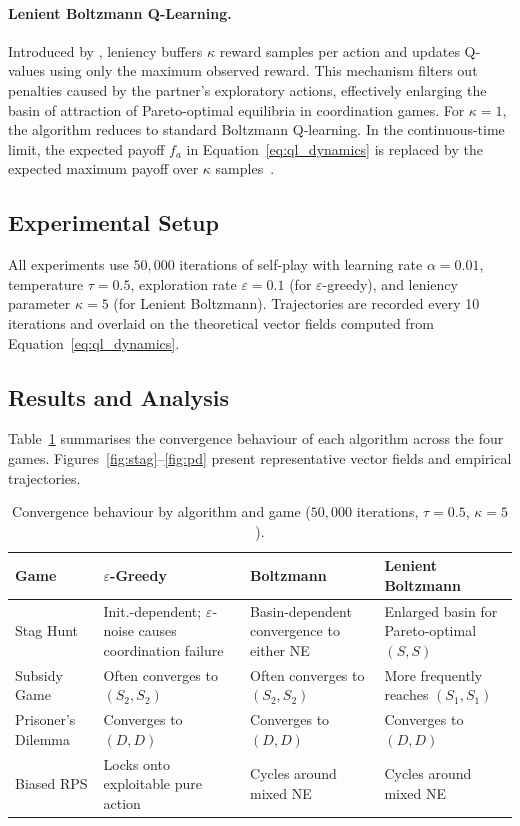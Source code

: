 \documentclass[11pt,a4paper]{article}
\begin{document}
\paragraph{Lenient Boltzmann Q-Learning.}
Introduced by \citet{panait2006}, leniency buffers $\kappa$ reward samples per action and updates Q-values using only the maximum observed reward. This mechanism filters out penalties caused by the partner's exploratory actions, effectively enlarging the basin of attraction of Pareto-optimal equilibria in coordination games. For $\kappa = 1$, the algorithm reduces to standard Boltzmann Q-learning. In the continuous-time limit, the expected payoff $f_a$ in Equation~\eqref{eq:ql_dynamics} is replaced by the expected maximum payoff over $\kappa$ samples~\citep{panait2006,bloembergen2015}.

\subsection{Experimental Setup}
All experiments use $50{,}000$ iterations of self-play with learning rate $\alpha = 0.01$, temperature $\tau = 0.5$, exploration rate $\varepsilon = 0.1$ (for $\varepsilon$-greedy), and leniency parameter $\kappa = 5$ (for Lenient Boltzmann). Trajectories are recorded every 10 iterations and overlaid on the theoretical vector fields computed from Equation~\eqref{eq:ql_dynamics}.

\subsection{Results and Analysis}
\label{sec:task2_results}

Table~\ref{tab:convergence} summarises the convergence behaviour of each algorithm across the four games. Figures~\ref{fig:stag}--\ref{fig:pd} present representative vector fields and empirical trajectories.

\begin{table}[H]
\centering
\caption{Convergence behaviour by algorithm and game ($50{,}000$ iterations, $\tau{=}0.5$, $\kappa{=}5$).}
\label{tab:convergence}
\renewcommand{\arraystretch}{1.4}
\begin{tabular}{p{3.2cm}|p{3.5cm}|p{3.5cm}|p{3.5cm}}
\toprule
\textbf{Game} & \textbf{$\varepsilon$-Greedy} & \textbf{Boltzmann} & \textbf{Lenient Boltzmann} \\
\midrule
Stag Hunt &
  Init.-dependent; $\varepsilon$-noise causes coordination failure &
  Basin-dependent convergence to either NE &
  Enlarged basin for Pareto-optimal $(S,S)$ \\
\hline
Subsidy Game &
  Often converges to $(S_2,S_2)$ &
  Often converges to $(S_2,S_2)$ &
  More frequently reaches $(S_1,S_1)$ \\
\hline
Prisoner's Dilemma &
  Converges to $(D,D)$ &
  Converges to $(D,D)$ &
  Converges to $(D,D)$ \\
\hline
Biased RPS &
  Locks onto exploitable pure action &
  Cycles around mixed NE &
  Cycles around mixed NE \\
\bottomrule
\end{tabular}
\end{table}
\end{document}
